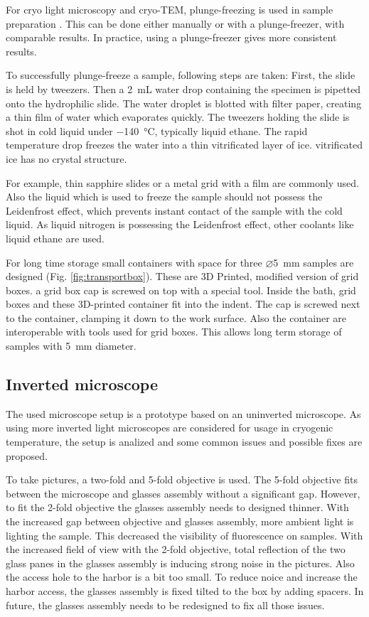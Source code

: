 For cryo light microscopy and cryo-TEM, plunge-freezing is used in sample preparation \cite{Danino.2012} \cite{Faoro.2018}. This can be done either manually or with a plunge-freezer, with comparable results. In practice, using a plunge-freezer gives more consistent results.

To successfully plunge-freeze a sample, following steps are taken: First, the slide is held by tweezers. Then a \SI{2}{\milli\liter} water drop containing the specimen is pipetted onto the hydrophilic slide. The water droplet is blotted with filter paper, creating a thin film of water which evaporates quickly. The tweezers holding the slide is shot in cold liquid under \SI{-140}{\degreeCelsius}, typically liquid ethane. The rapid temperature drop freezes the water into a thin vitrificated layer of ice. vitrificated ice has no crystal structure.

For example, thin sapphire slides or a metal grid with a film are commonly used. Also the liquid which is used to freeze the sample should not possess the Leidenfrost effect, which prevents instant contact of the sample with the cold liquid. As liquid nitrogen is possessing the Leidenfrost effect, other coolants like liquid ethane are used.

For long time storage small containers with space for three $\varnothing$\SI{5}{\milli\meter} samples are designed (Fig. \ref{fig:transportbox}). These are 3D Printed, modified version of grid boxes. a grid box cap is screwed on top with a special tool. Inside the bath, grid boxes and these 3D-printed container fit into the indent. The cap is screwed next to the container, clamping it down to the work surface. Also the container are interoperable with tools used for grid boxes. This allows long term storage of samples with \SI{5}{\milli\meter} diameter.


\subsection{Inverted microscope}

The used microscope setup is a prototype based on an uninverted microscope. As using more inverted light microscopes are considered for usage in cryogenic temperature, the setup is analized and some common issues and possible fixes are proposed.

To take pictures, a two-fold and 5-fold objective is used. The 5-fold objective fits between the microscope and glasses assembly without a significant gap. However, to fit the 2-fold objective the glasses assembly needs to designed thinner. With the increased gap between objective and glasses assembly, more ambient light is lighting the sample. This decreased the visibility of fluorescence on samples. With the increased field of view with the 2-fold objective, total reflection of the two glass panes in the glasses assembly is inducing strong noise in the pictures. Also the access hole to the harbor is a bit too small.
To reduce noice and increase the harbor access, the glasses assembly is fixed tilted to the box by adding spacers. In future, the glasses assembly needs to be redesigned to fix all those issues.

